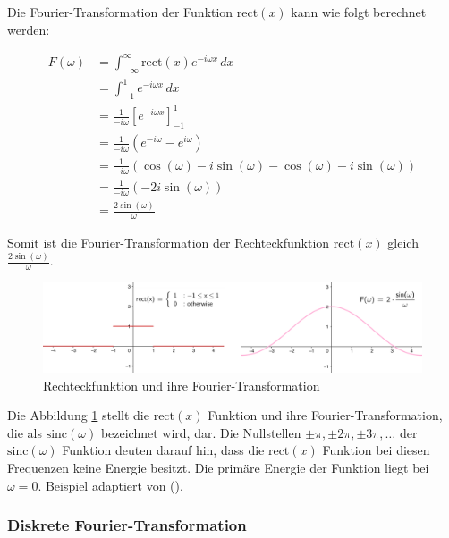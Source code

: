\documentclass[11pt,a4paper]{article}
\begin{document}
\noindent
Die Fourier-Transformation der Funktion \( \text{rect}(x) \) kann wie folgt berechnet werden:

\begin{equation*}
\begin{split}
F(\omega) &= \int_{-\infty}^{\infty} \text{rect}(x) e^{-i \omega x} \, dx \\
&= \int_{-1}^{1} e^{-i \omega x} \, dx \\
&= \frac{1}{-i \omega} \left[ e^{-i \omega x} \right]_{-1}^{1} \\
&= \frac{1}{-i \omega} \left( e^{-i \omega} - e^{i \omega} \right) \\
&= \frac{1}{-i \omega} \left( \cos(\omega) - i \sin(\omega) - \cos(\omega) - i \sin(\omega) \right) \\
&= \frac{1}{-i \omega} \left( -2 i \sin(\omega) \right) \\
&= \frac{2 \sin(\omega)}{\omega}
\end{split}
\end{equation*}
\noindent

\noindent
\newline
Somit ist die Fourier-Transformation der Rechteckfunktion \( \text{rect}(x) \) gleich
\( \displaystyle\frac{2 \sin(\omega)}{\omega} \).

\begin{figure}[h]
    \centering
    \includegraphics[width=0.8\linewidth]{img/example-fourier-trans.png}
    \caption{Rechteckfunktion und ihre Fourier-Transformation}
    \label{fig:fourier_transform}
\end{figure}

\noindent
Die Abbildung \ref{fig:fourier_transform} stellt die \( \text{rect}(x) \) Funktion und ihre 
Fourier-Transformation, die als \( \text{sinc}(\omega) \) bezeichnet wird, dar. Die Nullstellen 
\( \pm \pi, \pm 2 \pi, \pm 3 \pi, \dots \) der \( \text{sinc}(\omega) \) Funktion deuten darauf 
hin, dass die \( \text{rect}(x) \) Funktion bei diesen Frequenzen keine Energie besitzt. Die 
primäre Energie der Funktion liegt bei \( \omega=0 \). Beispiel adaptiert von 
(\cite[Chapter~5 - Example~5.1]{hansen2014fourier}).



\subsubsection{Diskrete Fourier-Transformation}
\end{document}
